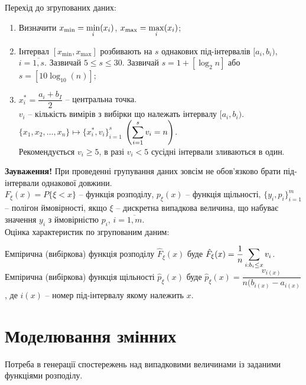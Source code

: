 Перехід до згрупованих даних:
\begin{enumerate}
    \item Визначити $x_{\min} = \displaystyle\min\limits_i (x_i)$, $x_{\max} = \displaystyle\max\limits_i (x_i)$;
    
    \item Інтервал $[x_{\min}, x_{\max}]$ розбивають на $s$ однакових під-інтервалів $[a_i, b_i)$, $i = \overline{1,s}$. Зазвичай $5 \le s \le 30$. Зазвичай $s = 1 + [\log_2 n]$ або $s = [10 \log_{10} (n)]$;
    
    \item $x_i^* = \dfrac{a_i + b_I}{2}$ -- центральна точка. \\
    
    $v_i$ -- кількість вимірів з вибірки що належать інтервалу $[a_i, b_i)$. \\
    
    $\{x_1, x_2, \ldots, x_n\} \mapsto \{x_i^*, v_i\}_{i=1}^s$ $\left( \displaystyle\sum\limits_{i=1}^s v_i = n \right)$. \\
    
    Рекомендується $v_i \ge 5$, в разі $v_i < 5$ сусідні інтервали зливаються в один.
\end{enumerate}

\textbf{Зауваження!} При проведенні групування даних зовсім не обов'язково брати під-інтервали однакової довжини. \\

$F_\xi (x) = P\{ \xi < x\}$ -- функція розподілу, $p_\xi(x)$ -- функція щільності, $\{ y_i, p_i \}_{i=1}^m$ -- полігон ймовірності, якщо $\xi$ -- дискретна випадкова величина, що набуває значення $y_i$ з ймовірністю $p_i$, $i=\overline{1,m}$. \\

Оцінка характеристик по згрупованим даним:

Емпірична (вибіркова) функція розподілу $\hat{F}_\xi (x)$ буде $\hat{F}_\xi (x) = \dfrac{1}{n} \displaystyle\sum\limits_{i: b_i \le x} v_i$. \\

Емпірична (вибіркова) функція щільності $\hat{p}_\xi (x)$ буде $\hat{p}_\xi (x) = \dfrac{v_{i(x)}}{n (b_{i(x)} - a_{i(x)}}$, де $i(x)$ -- номер під-інтервалу якому належить $x$.

\section{Моделювання змінних}

Потреба в генерації спостережень над випадковими величинами із заданими функціями розподілу. \\

